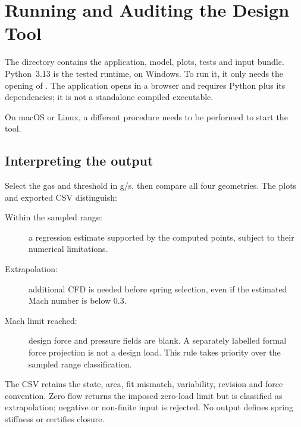 \section{Running and Auditing the Design Tool}
\label{sec:app_tool_operation}

The  directory contains the application, model, plots, tests and input bundle. Python~3.13 is the tested runtime, on Windows. To run it, it only needs the opening of . The application opens in a browser and requires Python plus its dependencies; it is not a standalone compiled executable.

On macOS or Linux, a different procedure needs to be performed to start the tool.


\subsection{Interpreting the output}
Select the gas and threshold in g/s, then compare all four geometries. The plots and exported CSV distinguish:
\begin{description}
\item[Within the sampled range:] a regression estimate supported by the computed points, subject to their numerical limitations.
\item[Extrapolation:] additional CFD is needed before spring selection, even if the estimated Mach number is below $0.3$.
\item[Mach limit reached:] design force and pressure fields are blank. A separately labelled formal force projection is not a design load. This rule takes priority over the sampled range classification.
\end{description}

The CSV retains the state, area, fit mismatch, variability, revision and force convention. Zero flow returns the imposed zero-load limit but is classified as extrapolation; negative or non-finite input is rejected. No output defines spring stiffness or certifies closure.

